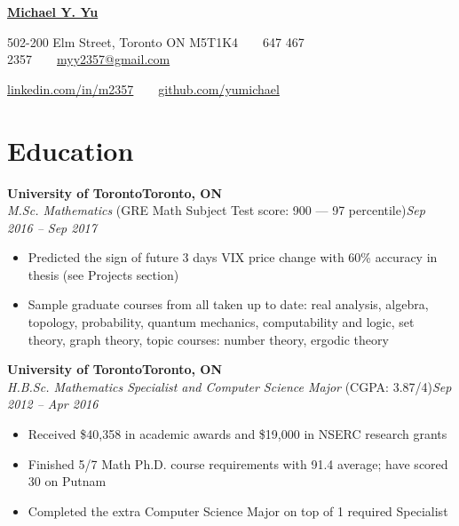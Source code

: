 \documentclass[10pt,letterpaper]{article}
\newcommand*\company[1]{\textbf{#1}}
\newcommand*\position[1]{\textit{#1}}
\newcommand*\location\company
\newcommand*\timespan\position
\begin{document}
\pagestyle{empty}
\begin{center}
{\huge\textbf{\href{https://github.com/yumichael/resume-v5}{Michael Y. Yu}}}

502-200 Elm Street, Toronto ON M5T1K4\ \ \textbullet\ \ 647 467 2357\ \ \textbullet\ \ \href{mailto:myy2357@gmail.com}{myy2357@gmail.com}

\href{https://www.linkedin.com/in/m2357/}{linkedin.com/in/m2357}\ \ \textbullet\ \ \href{https://github.com/yumichael}{github.com/yumichael}
\end{center}
\section*{Education}
\company{University of Toronto}\hfill\location{Toronto, ON}\\
\position{M.Sc. Mathematics} (GRE Math Subject Test score: 900 --- 97 percentile)\hfill\timespan{Sep 2016 -- Sep 2017}
\begin{itemize}
\item Predicted the sign of future 3 days VIX price change with 60\% accuracy in thesis (see Projects section)
\item Sample graduate courses from all taken up to date: real analysis, algebra, topology, probability, quantum mechanics, computability and logic, set theory, graph theory, topic courses: number theory, ergodic theory
\end{itemize}
\company{University of Toronto}\hfill\location{Toronto, ON}\\
\position{H.B.Sc. Mathematics Specialist and Computer Science Major} (CGPA: 3.87/4)\hfill\timespan{Sep 2012 -- Apr 2016}
\begin{itemize}
\item Received \$40,358 in academic awards and \$19,000 in NSERC research grants
\item Finished 5/7 Math Ph.D. course requirements with 91.4 average; have scored 30 on Putnam
\item Completed the extra Computer Science Major on top of 1 required Specialist
\end{itemize}
\end{document}
